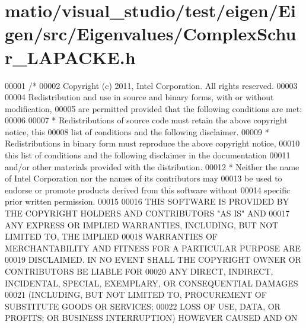 \hypertarget{matio_2visual__studio_2test_2eigen_2_eigen_2src_2_eigenvalues_2_complex_schur___l_a_p_a_c_k_e_8h_source}{}\section{matio/visual\+\_\+studio/test/eigen/\+Eigen/src/\+Eigenvalues/\+Complex\+Schur\+\_\+\+L\+A\+P\+A\+C\+KE.h}
\label{matio_2visual__studio_2test_2eigen_2_eigen_2src_2_eigenvalues_2_complex_schur___l_a_p_a_c_k_e_8h_source}

\begin{DoxyCode}
00001 \textcolor{comment}{/*}
00002 \textcolor{comment}{ Copyright (c) 2011, Intel Corporation. All rights reserved.}
00003 \textcolor{comment}{}
00004 \textcolor{comment}{ Redistribution and use in source and binary forms, with or without modification,}
00005 \textcolor{comment}{ are permitted provided that the following conditions are met:}
00006 \textcolor{comment}{}
00007 \textcolor{comment}{ * Redistributions of source code must retain the above copyright notice, this}
00008 \textcolor{comment}{   list of conditions and the following disclaimer.}
00009 \textcolor{comment}{ * Redistributions in binary form must reproduce the above copyright notice,}
00010 \textcolor{comment}{   this list of conditions and the following disclaimer in the documentation}
00011 \textcolor{comment}{   and/or other materials provided with the distribution.}
00012 \textcolor{comment}{ * Neither the name of Intel Corporation nor the names of its contributors may}
00013 \textcolor{comment}{   be used to endorse or promote products derived from this software without}
00014 \textcolor{comment}{   specific prior written permission.}
00015 \textcolor{comment}{}
00016 \textcolor{comment}{ THIS SOFTWARE IS PROVIDED BY THE COPYRIGHT HOLDERS AND CONTRIBUTORS "AS IS" AND}
00017 \textcolor{comment}{ ANY EXPRESS OR IMPLIED WARRANTIES, INCLUDING, BUT NOT LIMITED TO, THE IMPLIED}
00018 \textcolor{comment}{ WARRANTIES OF MERCHANTABILITY AND FITNESS FOR A PARTICULAR PURPOSE ARE}
00019 \textcolor{comment}{ DISCLAIMED. IN NO EVENT SHALL THE COPYRIGHT OWNER OR CONTRIBUTORS BE LIABLE FOR}
00020 \textcolor{comment}{ ANY DIRECT, INDIRECT, INCIDENTAL, SPECIAL, EXEMPLARY, OR CONSEQUENTIAL DAMAGES}
00021 \textcolor{comment}{ (INCLUDING, BUT NOT LIMITED TO, PROCUREMENT OF SUBSTITUTE GOODS OR SERVICES;}
00022 \textcolor{comment}{ LOSS OF USE, DATA, OR PROFITS; OR BUSINESS INTERRUPTION) HOWEVER CAUSED AND ON}

\end{DoxyCode}

